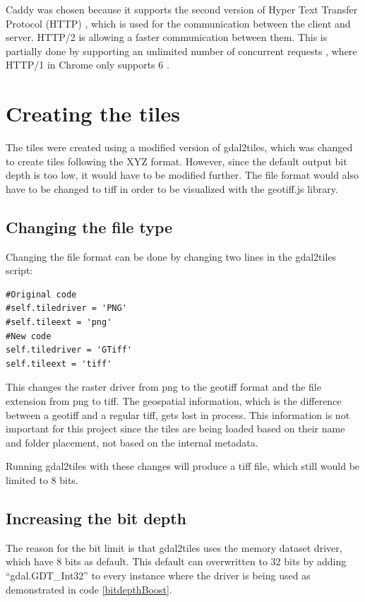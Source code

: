 Caddy was chosen because it supports the second version of Hyper Text Transfer Protocol (HTTP)
\citep{WhyCaddy}, which is used for the communication between the client and server.
\citep{WhatIsHTTP} HTTP/2 is allowing a faster communication between them. \citep{HTTP2} This is partially done by supporting an unlimited number of concurrent requests \citep{DomainSharding}, where HTTP/1 in Chrome only supports 6 \citep{OnlySix}.



\section{Creating the tiles}\label{MakeTiles}
The tiles were created using a modified version of gdal2tiles, which was changed to create tiles following the XYZ format. However, since the default output bit depth is too low, it would have to be modified further. The file format would also have to be changed to tiff in order to be visualized with the geotiff.js library. 

\subsection{Changing the file type}
Changing the file format can be done by changing two lines in the gdal2tiles script:

\begin{lstlisting}[language=iPython, caption={Changing the file format}, label= VoresPY,escapechar=|]
#Original code
#self.tiledriver = 'PNG'
#self.tileext = 'png'
#New code
self.tiledriver = 'GTiff'
self.tileext = 'tiff'
\end{lstlisting}
This changes the raster driver from png to the geotiff format and the file extension from png to tiff. 
\citep{RasterDrivers}
The geospatial information, which is the difference between a geotiff and a regular tiff, gets lost in process. This information is not important for this project since the tiles are being loaded based on their name and folder placement, not based on the internal metadata.

Running gdal2tiles with these changes will produce a tiff file, which still would be limited to 8 bits. 
\subsection{Increasing the bit depth}\label{IncreasingBitDepth}
The reason for the bit limit is that gdal2tiles uses the memory dataset driver, which have 8 bits as default.  This default can overwritten to 32 bits by adding “gdal.GDT\_Int32” to every instance where the driver is being used as demonstrated in code \ref{bitdepthBoost}. 
\citep{MoreThan8}

